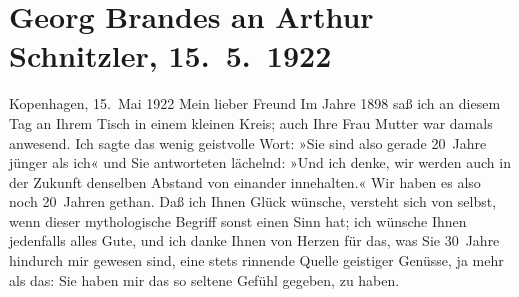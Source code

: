 

               \section[Georg Brandes an Arthur Schnitzler, 15. 5. 1922]{ Georg Brandes an Arthur Schnitzler, 15. 5. 1922}\nopagebreak{}\rehead{ }\begin{ledgroupsized}[t]{13cm}\normalsize\beginnumbering{} \toendnotes[C]{\smallbreak\pagebreak[2]} \toendnotes[C]{\smallbreak}\pstart
           \raggedleft{}{\pb}Kopenhagen, 15. Mai 1922\pend
           \pstart{}Mein lieber Freund\pend\pstart
           Im Jahre 1898 saß ich an diesem Tag an Ihrem Tisch in einem kleinen
               Kreis; auch Ihre Frau Mutter
               war damals anwesend. Ich sagte das wenig geistvolle Wort: »Sie sind also gerade
               20 Jahre jünger als ich« und Sie antworteten lächelnd: »Und ich denke, wir werden
               auch in der Zukunft denselben Abstand von einander innehalten.«\pend
           \pstart
           Wir haben es also noch 20 Jahren gethan. Daß ich Ihnen Glück wünsche, versteht sich
               von selbst, wenn dieser mythologische Begriff sonst einen Sinn hat; ich wünsche Ihnen
               jedenfalls alles Gute, und ich danke Ihnen von Herzen für das, was Sie 30 Jahre
               hindurch mir gewesen sind, eine stets rinnende Quelle geistiger Genüsse, ja mehr als
               das: Sie haben mir das so seltene Gefühl gegeben, \emph{\label{K_L02383_1v}\label{K_L02383_1h}} zu haben.\pend

\end{ledgroupsized}
